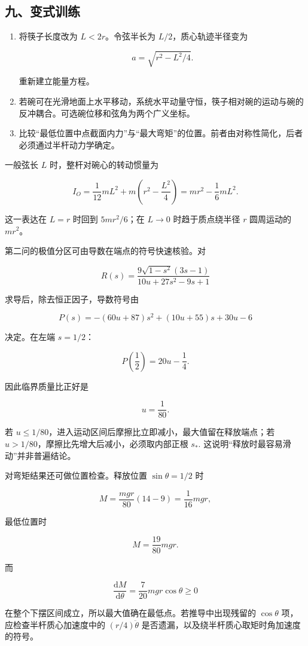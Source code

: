 \documentclass[12pt,a4paper,UTF8]{ctexart}
\begin{document}
\subsection{九、变式训练}\label{ux4e5dux53d8ux5f0fux8badux7ec3-6}

\begin{enumerate}
\def\labelenumi{\arabic{enumi}.}
\item
  将筷子长度改为 \(L<2r\)。令弦半长为 \(L/2\)，质心轨迹半径变为

  \[a=\sqrt{r^2-L^2/4}.\]

  重新建立能量方程。
\item
  若碗可在光滑地面上水平移动，系统水平动量守恒，筷子相对碗的运动与碗的反冲耦合。可选碗位移和弦角为两个广义坐标。
\item
  比较``最低位置中点截面内力''与``最大弯矩''的位置。前者由对称性简化，后者必须通过半杆动力学确定。
\end{enumerate}

一般弦长 \(L\) 时，整杆对碗心的转动惯量为

\[I_O=\frac1{12}mL^2+m\left(r^2-\frac{L^2}{4}\right)
=mr^2-\frac16mL^2.\]

这一表达在 \(L=r\) 时回到 \(5mr^2/6\)；在 \(L\to0\) 时趋于质点绕半径
\(r\) 圆周运动的 \(mr^2\)。

第二问的极值分区可由导数在端点的符号快速核验。对

\[R(s)=\frac{9\sqrt{1-s^2}(3s-1)}{10u+27s^2-9s+1}\]

求导后，除去恒正因子，导数符号由

\[P(s)=-(60u+87)s^2+(10u+55)s+30u-6\]

决定。在左端 \(s=1/2\)：

\[P\left(\frac12\right)=20u-\frac14.\]

因此临界质量比正好是

\[u=\frac1{80}.\]

若 \(u\le1/80\)，进入运动区间后摩擦比立即减小，最大值留在释放端点；若
\(u>1/80\)，摩擦比先增大后减小，必须取内部正根 \(s_*\).
这说明``释放时最容易滑动''并非普遍结论。

对弯矩结果还可做位置检查。释放位置 \(\sin\theta=1/2\) 时

\[M=\frac{mgr}{80}(14-9)=\frac1{16}mgr,\]

最低位置时

\[M=\frac{19}{80}mgr.\]

而

\[\frac{\mathrm{d}M}{\mathrm{d}\theta}=\frac{7}{20}mgr\cos\theta\ge0\]

在整个下摆区间成立，所以最大值确在最低点。若推导中出现残留的
\(\cos\theta\) 项，应检查半杆质心加速度中的 \((r/4)\ddot\theta\)
是否遗漏，以及绕半杆质心取矩时角加速度的符号。
\end{document}
